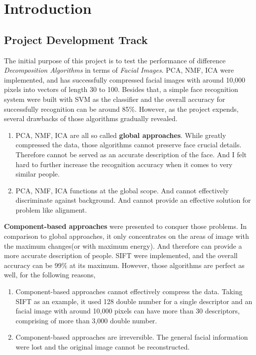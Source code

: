 \chapter{Introduction}

\section{Project Development Track}
The initial purpose of this project is to test the performance of difference \textit{Decomposition Algorithms} in terms of \textit{Facial Images}. PCA, NMF, ICA were implemented, and has successfully compressed facial images with around 10,000 pixels into vectors of length 30 to 100. Besides that, a simple face recognition system were built with SVM as the classifier and the overall accuracy for successfully recognition can be around 85\%. However, as the project expends, several drawbacks of those algorithms gradually revealed. 
\begin{enumerate}
    \item PCA, NMF, ICA are all so called \textbf{global approaches}. While greatly compressed the data, those algorithms cannot preserve face crucial details. Therefore cannot be served as an accurate description of the face. And I felt hard to further increase the recognition accuracy when it comes to very similar people.
    \item PCA, NMF, ICA functions at the global scope. And cannot effectively discriminate against background. And cannot provide an effective solution for problem like alignment.
\end{enumerate}

\textbf{Component-based approaches} were presented to conquer those problems. In comparison to global 
approaches, it only concentrates on the areas of image with the maximum changes(or with maximum energy). And therefore can provide a more accurate description of people. SIFT were implemented, and the overall accuracy can be 99\% at its maximum. However, those algorithms are perfect as well, for the following reasons,
\begin{enumerate}
    \item Component-based approaches cannot effectively compress the data. Taking SIFT as an example, it used 128 double number for a single descriptor and an facial image with around 10,000 pixels can have more than 30 descriptors, comprising of more than 3,000 double number.
    \item Component-based approaches are irreversible. The general facial information were lost and the original image cannot be reconstructed.
\end{enumerate}

